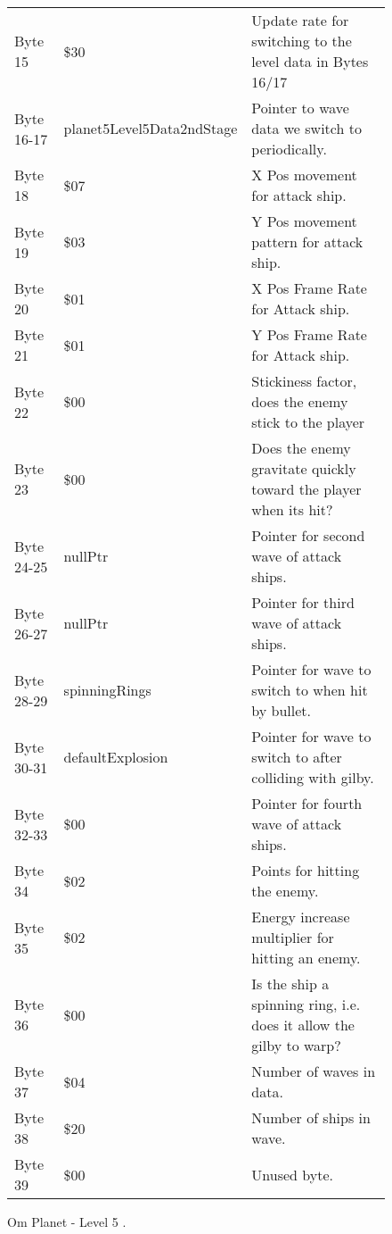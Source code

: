 \begin{figure}[H]
{\begin{adjustbox}{width=12cm}
\begin{tabular}{lll}
 Byte 15    & \$30                       & Update rate for switching to the level data in Bytes 16/17          \\
 Byte 16-17 & planet5Level5Data2ndStage & Pointer to wave data we switch to periodically.                     \\
 Byte 18    & \$07                       & X Pos movement for attack ship.                                     \\
 Byte 19    & \$03                       & Y Pos movement pattern for attack ship.                             \\
 Byte 20    & \$01                       & X Pos Frame Rate for Attack ship.                                   \\
 Byte 21    & \$01                       & Y Pos Frame Rate for Attack ship.                                   \\
 Byte 22    & \$00                       & Stickiness factor, does the enemy stick to the player               \\
 Byte 23    & \$00                       & Does the enemy gravitate quickly toward the player when its hit?    \\
 Byte 24-25 & nullPtr                   & Pointer for second wave of attack ships.                            \\
 Byte 26-27 & nullPtr                   & Pointer for third wave of attack ships.                             \\
 Byte 28-29 & spinningRings             & Pointer for wave to switch to when hit by bullet.                   \\
 Byte 30-31 & defaultExplosion          & Pointer for  wave to switch to after colliding with gilby.          \\
 Byte 32-33 & \$00                       & Pointer for fourth wave of attack ships.                            \\
 Byte 34    & \$02                       & Points for hitting the enemy.                                       \\
 Byte 35    & \$02                       & Energy increase multiplier for hitting an enemy.                    \\
 Byte 36    & \$00                       & Is the ship a spinning ring, i.e. does it allow the gilby to warp?  \\
 Byte 37    & \$04                       & Number of waves in data.                                            \\
 Byte 38    & \$20                       & Number of ships in wave.                                            \\
 Byte 39    & \$00                       & Unused byte.                                                        \\
\bottomrule
\end{tabular}

  \end{adjustbox}

  }\caption*{Om Planet - Level 5
.}
\end{figure}

